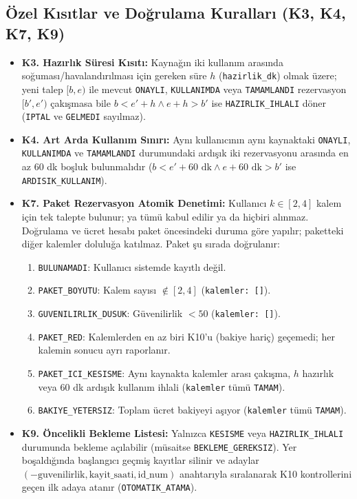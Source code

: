 \documentclass[conference]{IEEEtran}
\begin{document}
\subsection{Özel Kısıtlar ve Doğrulama Kuralları (K3, K4, K7, K9)}
\begin{itemize}
    \item \textbf{K3. Hazırlık Süresi Kısıtı:} Kaynağın iki kullanım arasında soğuması/havalandırılması için gereken süre $h$ (\texttt{hazirlik\_dk}) olmak üzere; yeni talep $[b, e)$ ile mevcut \texttt{ONAYLI}, \texttt{KULLANIMDA} veya \texttt{TAMAMLANDI} rezervasyon $[b', e')$ çakışmasa bile $b < e' + h \land e + h > b'$ ise \texttt{HAZIRLIK\_IHLALI} döner (\texttt{IPTAL} ve \texttt{GELMEDI} sayılmaz).
    \item \textbf{K4. Art Arda Kullanım Sınırı:} Aynı kullanıcının aynı kaynaktaki \texttt{ONAYLI}, \texttt{KULLANIMDA} ve \texttt{TAMAMLANDI} durumundaki ardışık iki rezervasyonu arasında en az 60 dk boşluk bulunmalıdır ($b < e' + 60\text{ dk} \land e + 60\text{ dk} > b'$ ise \texttt{ARDISIK\_KULLANIM}).
    \item \textbf{K7. Paket Rezervasyon Atomik Denetimi:} Kullanıcı $k \in [2, 4]$ kalem için tek talepte bulunur; ya tümü kabul edilir ya da hiçbiri alınmaz. Doğrulama ve ücret hesabı paket öncesindeki duruma göre yapılır; paketteki diğer kalemler doluluğa katılmaz. Paket şu sırada doğrulanır:
    \begin{enumerate}
        \item \texttt{BULUNAMADI}: Kullanıcı sistemde kayıtlı değil.
        \item \texttt{PAKET\_BOYUTU}: Kalem sayısı $\notin [2, 4]$ (\texttt{kalemler: []}).
        \item \texttt{GUVENILIRLIK\_DUSUK}: Güvenilirlik $< 50$ (\texttt{kalemler: []}).
        \item \texttt{PAKET\_RED}: Kalemlerden en az biri K10'u (bakiye hariç) geçemedi; her kalemin sonucu ayrı raporlanır.
        \item \texttt{PAKET\_ICI\_KESISME}: Aynı kaynakta kalemler arası çakışma, $h$ hazırlık veya 60 dk ardışık kullanım ihlali (\texttt{kalemler} tümü \texttt{TAMAM}).
        \item \texttt{BAKIYE\_YETERSIZ}: Toplam ücret bakiyeyi aşıyor (\texttt{kalemler} tümü \texttt{TAMAM}).
    \end{enumerate}
    \item \textbf{K9. Öncelikli Bekleme Listesi:} Yalnızca \texttt{KESISME} veya \texttt{HAZIRLIK\_IHLALI} durumunda bekleme açılabilir (müsaitse \texttt{BEKLEME\_GEREKSIZ}). Yer boşaldığında başlangıcı geçmiş kayıtlar silinir ve adaylar $(-\text{guvenilirlik}, \text{kayit\_saati}, \text{id\_num})$ anahtarıyla sıralanarak K10 kontrollerini geçen ilk adaya atanır (\texttt{OTOMATIK\_ATAMA}).
\end{itemize}
\end{document}
